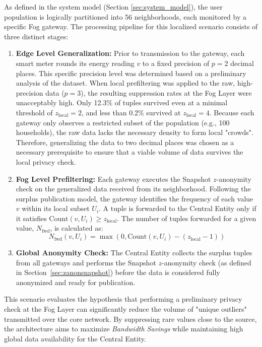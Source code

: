 As defined in the system model (Section \ref{sec:system_model}), the user population is logically partitioned into 56 neighborhoods, each monitored by a specific Fog gateway. The processing pipeline for this localized scenario consists of three distinct stages:



\begin{enumerate}
    \item \textbf{Edge Level Generalization:} Prior to transmission to the gateway, each smart meter rounds its energy reading $v$ to a fixed precision of $p=2$ decimal places. This specific precision level was determined based on a preliminary analysis of the dataset. When local prefiltering was applied to the raw, high-precision data ($p=3$), the resulting suppression rates at the Fog Layer were unacceptably high. Only 12.3\% of tuples survived even at a minimal threshold of $z_{\text{local}}=2$, and less than 0.2\% survived at $z_{\text{local}}=4$. Because each gateway only observes a restricted subset of the population (e.g., 100 households), the raw data lacks the necessary density to form local "crowds". Therefore, generalizing the data to two decimal places was chosen as a necessary prerequisite to ensure that a viable volume of data survives the local privacy check.
    \item \textbf{Fog Level Prefiltering:} Each gateway executes the Snapshot $z$-anonymity check on the generalized data received from its neighborhood. Following the surplus publication model, the gateway identifies the frequency of each value $v$ within its local subset $U_i$. A tuple is forwarded to the Central Entity only if it satisfies $\text{Count}(v, U_i) \geq z_{\text{local}}$. The number of tuples forwarded for a given value, $N_{\text{fwd}}$, is calculated as:
    \begin{equation}
        N_{\text{fwd}}(v, U_i) = \max(0, \text{Count}(v, U_i) - (z_{\text{local}} - 1))
    \end{equation}
    \item \textbf{Global Anonymity Check:} The Central Entity collects the surplus tuples from all gateways and performs the Snapshot $z$-anonymity check (as defined in Section~\ref{sec:zanonsnapshot}) before the data is considered fully anonymized and ready for publication.
\end{enumerate}

This scenario evaluates the hypothesis that performing a preliminary privacy check at the Fog Layer can significantly reduce the volume of "unique outliers" transmitted over the core network. By suppressing rare values close to the source, the architecture aims to maximize \textit{Bandwidth Savings} while maintaining high global data availability for the Central Entity.


